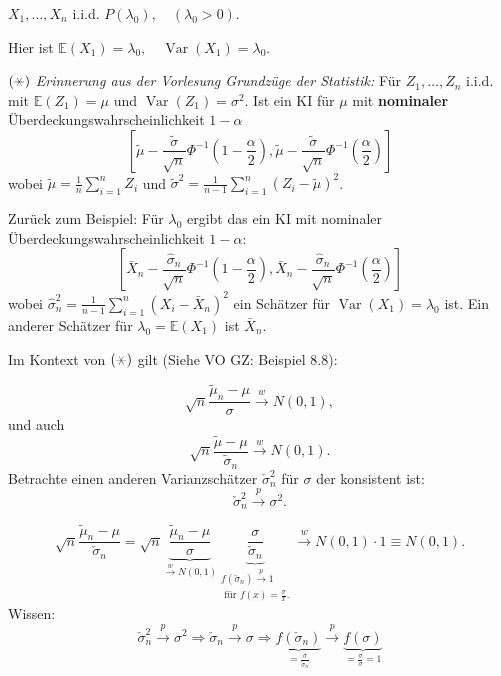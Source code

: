 \documentclass{tstextbook}
\DeclareMathOperator{\Var}{Var}
\newcommand{\E}{\mathbb E}
\begin{document}
\begin{example}
	$ X_1,\ldots,X_n $ i.i.d. $ P(\lambda_0), \quad (\lambda_0 > 0) $. 
	
	Hier ist $ \E(X_1)=\lambda_0, \quad \Var(X_1)=\lambda_0 $. 
	
	
	$ (\hexstar) $ \textit{Erinnerung aus der Vorlesung Grundzüge der Statistik:} 
	Für $ Z_1,\ldots, Z_n $ i.i.d. mit $ \E(Z_1) = \mu $ und $ \Var(Z_1) = \sigma^2 $. Ist ein KI für $ \mu $ mit \textbf{nominaler}  Überdeckungswahrscheinlichkeit $ 1 - \alpha $ 
	\[
	\left[\tilde{\mu} - \frac{\tilde{\sigma}}{\sqrt{n}} \Phi^{-1}\left(1-\frac{\alpha}{2}\right), \tilde{\mu} - \frac{\tilde{\sigma}}{\sqrt{n}} \Phi^{-1}\left(\frac{\alpha}{2}\right) \right]
	\]
	wobei $ \tilde{\mu}= \frac{1}{n}\sum_{i=1}^{n} Z_i $ und $ \tilde{\sigma}^2 = \frac{1}{n-1} \sum_{i=1}^{n} (Z_i - \tilde{\mu})^2 $.
	
	Zurück zum Beispiel: Für $ \lambda_0 $ ergibt das ein KI mit nominaler Überdeckungswahrscheinlichkeit $ 1 - \alpha $: 
	\[
	\left[\bar{X}_n - \frac{\hat{\sigma}_n}{\sqrt{n}} \Phi^{-1}\left(1-\frac{\alpha}{2}\right), \bar{X}_n - \frac{\hat{\sigma}_n}{\sqrt{n}} \Phi^{-1}\left(\frac{\alpha}{2}\right) \right]
	\]
	wobei $ \hat{\sigma}_n^2 = \frac{1}{n-1} \sum_{i=1}^{n} (X_i - \bar{X}_n)^2 $ ein Schätzer für $ \Var(X_1) = \lambda_0 $ ist. Ein anderer Schätzer für $ \lambda_0 = \E(X_1) $ ist $ \bar{X}_n $.
	
	
	Im Kontext von $ (\hexstar) $ gilt (Siehe VO GZ: Beispiel 8.8): 
	
	\[
	\sqrt{n} \frac{\tilde{\mu}_n-\mu}{\sigma} \overset{w}{\longrightarrow} N(0,1), 
	\] und auch
	\[
	\sqrt{n} \frac{\tilde{\mu}-\mu}{\tilde{\sigma}_n} \overset{w}{\longrightarrow} N(0,1). 
	\]
	Betrachte einen anderen Varianzschätzer $ \check{\sigma}_n^2 $ für $ \sigma $ der konsistent ist: \[ \check{\sigma}_n^2 \xrightarrow{p} \sigma^2 . \]
	
	\[
	\sqrt{n} \frac{\tilde{\mu}_n - \mu}{\check{\sigma}_n} = \sqrt{n} \underbrace{\frac{\tilde{\mu}_n - \mu}{\sigma}}_{\xrightarrow{w}N(0,1)} \underbrace{\frac{\sigma}{\check{\sigma}_n}}_{\substack{ f(\check{\sigma}_n) \xrightarrow{p}1 \\ \text{ für } f(x) = \frac{\sigma}{x}.}} \xrightarrow{w} N(0,1)\cdot 1 \equiv N(0,1).
	\]
	Wissen: \[ \check{\sigma}_n^2 \xrightarrow{p} \sigma^2 \Rightarrow \check{\sigma}_n \xrightarrow{p} \sigma \Rightarrow \underbrace{f(\check{\sigma}_n)}_{=\frac{\sigma}{\check{\sigma}_n}} \xrightarrow{p} \underbrace{f(\sigma)}_{= \frac{\sigma}{\sigma}=1} \]
	

\end{example}
\end{document}
